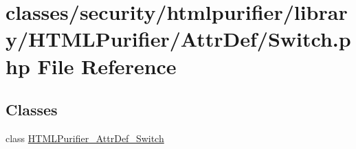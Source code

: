 \hypertarget{Switch_8php}{\section{classes/security/htmlpurifier/library/\+H\+T\+M\+L\+Purifier/\+Attr\+Def/\+Switch.php File Reference}
\label{Switch_8php}
}
\subsection*{Classes}
\begin{DoxyCompactItemize}
\item 
class \hyperlink{classHTMLPurifier__AttrDef__Switch}{H\+T\+M\+L\+Purifier\+\_\+\+Attr\+Def\+\_\+\+Switch}
\end{DoxyCompactItemize}
